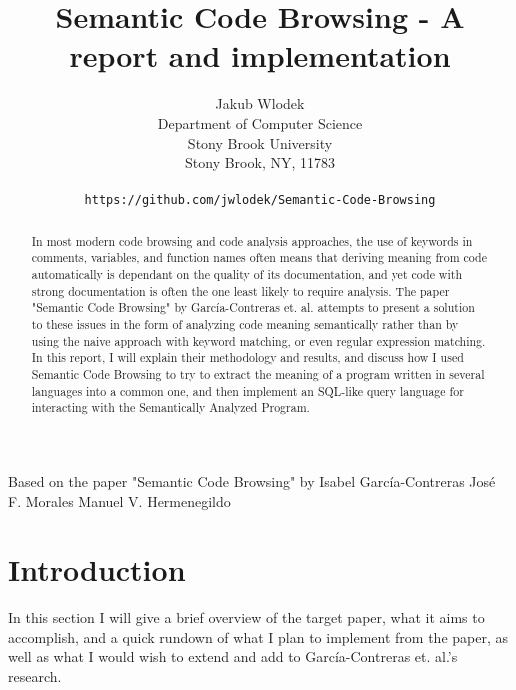 \documentclass{article}
\title{Semantic Code Browsing - A report and implementation}
\author{
  Jakub Wlodek \\
  Department of Computer Science\\
  Stony Brook University\\
  Stony Brook, NY, 11783\\\\
  \texttt{https://github.com/jwlodek/Semantic-Code-Browsing}
}
\begin{document}
\begin{center}
    Based on the paper "Semantic Code Browsing" by Isabel García-Contreras José F. Morales Manuel V. Hermenegildo
\end{center}

\maketitle


\begin{abstract}
In most modern code browsing and code analysis approaches, the use of keywords in comments, variables, and function names often means that deriving meaning from code automatically is dependant on the quality of its documentation, and yet code with strong documentation is often the one least likely to require analysis. The paper "Semantic Code Browsing" by García-Contreras et. al. attempts to present a solution to these issues in the form of analyzing code meaning semantically rather than by using the naive approach with keyword matching, or even regular expression matching. In this report, I will explain their methodology and results, and discuss how I used Semantic Code Browsing to try to extract the meaning of a program written in several languages into a common one, and then implement an SQL-like query language for interacting with the Semantically Analyzed Program.
\end{abstract}




\section{Introduction}

In this section I will give a brief overview of the target paper, what it aims to accomplish, and a quick rundown of what I plan to implement from the paper, as well as what I would wish to extend and add to García-Contreras et. al.'s research.
\end{document}
